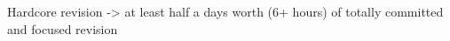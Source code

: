 
Hardcore revision -> at least half a days worth (6+ hours) of totally committed and focused revision
